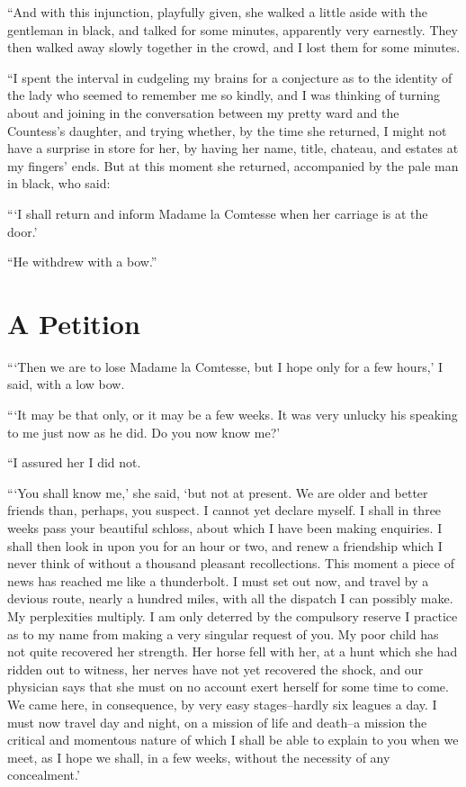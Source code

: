 \documentclass[11pt,twoside,makeidx,hidelinks,]{memoir}
\begin{document}
``And with this injunction, playfully given, she walked a little aside
with the gentleman in black, and talked for some minutes, apparently
very earnestly. They then walked away slowly together in the crowd, and
I lost them for some minutes.

``I spent the interval in cudgeling my brains for a conjecture as to the
identity of the lady who seemed to remember me so kindly, and I was
thinking of turning about and joining in the conversation between my
pretty ward and the Countess's daughter, and trying whether, by the time
she returned, I might not have a surprise in store for her, by having
her name, title, chateau, and estates at my fingers' ends. But at this
moment she returned, accompanied by the pale man in black, who said:

``{}`I shall return and inform Madame la Comtesse when her carriage is at
the door.'

``He withdrew with a bow.''

\pbreak{}

\chapter{A Petition}\hypertarget{a-petition}{}\label{a-petition}

``{}`Then we are to lose Madame la Comtesse, but I hope only for a few
hours,' I said, with a low bow.

``{}`It may be that only, or it may be a few weeks. It was very unlucky his
speaking to me just now as he did. Do you now know me?'

``I assured her I did not.

``{}`You shall know me,' she said, `but not at present. We are older and
better friends than, perhaps, you suspect. I cannot yet declare myself.
I shall in three weeks pass your beautiful schloss, about which I have
been making enquiries. I shall then look in upon you for an hour or two,
and renew a friendship which I never think of without a thousand
pleasant recollections. This moment a piece of news has reached me like
a thunderbolt. I must set out now, and travel by a devious route, nearly
a hundred miles, with all the dispatch I can possibly make. My
perplexities multiply. I am only deterred by the compulsory reserve I
practice as to my name from making a very singular request of you. My
poor child has not quite recovered her strength. Her horse fell with
her, at a hunt which she had ridden out to witness, her nerves have not
yet recovered the shock, and our physician says that she must on no
account exert herself for some time to come. We came here, in
consequence, by very easy stages--hardly six leagues a day. I must now
travel day and night, on a mission of life and death--a mission the
critical and momentous nature of which I shall be able to explain to you
when we meet, as I hope we shall, in a few weeks, without the necessity
of any concealment.'
\end{document}
